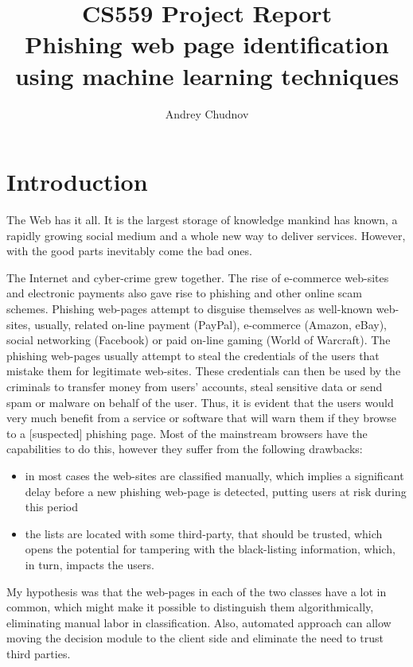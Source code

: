 \documentclass{article}
\title{CS559 Project Report \\ Phishing web page identification
  using machine learning techniques}
\author{Andrey Chudnov}
\begin{document}
\maketitle

\section{Introduction}
\label{sec:introduction}

The Web has it all. It is the largest storage of knowledge mankind has
known, a rapidly growing social medium and a whole new way to deliver
services. However, with the good parts inevitably come the bad ones.

The Internet and cyber-crime grew together. The rise of e-commerce
web-sites and electronic payments also gave rise to phishing and other
online scam schemes. Phishing web-pages attempt to disguise themselves
as well-known web-sites, usually, related on-line payment (PayPal),
e-commerce (Amazon, eBay), social networking (Facebook) or paid on-line
gaming (World of Warcraft). The phishing web-pages usually attempt to
steal the credentials of the users that mistake them for legitimate
web-sites. These credentials can then be used by the criminals to
transfer money from users' accounts, steal sensitive data or send spam
or malware on behalf of the user. Thus, it is evident that the users
would very much benefit from a service or software that will warn them
if they browse to a [suspected] phishing page. Most of the mainstream
browsers have the capabilities to do this, however they suffer from
the following drawbacks: 
\begin{itemize}
\item in most cases the web-sites are classified manually, which
  implies a significant delay before a new phishing web-page is
  detected, putting users at risk during this period

\item the lists are located with some third-party, that should be
  trusted, which opens the potential for tampering with the
  black-listing information, which, in turn, impacts the users.
\end{itemize}

My hypothesis was that the web-pages in each of the two classes have a
lot in common, which might make it possible to distinguish them
algorithmically, eliminating manual labor in classification. Also,
automated approach can allow moving the decision module to the
client side and eliminate the need to trust third parties.
\end{document}

